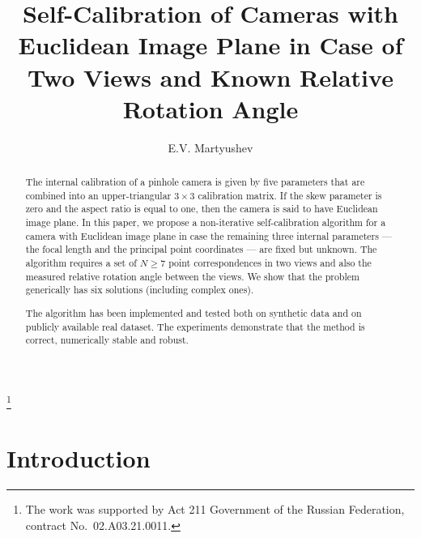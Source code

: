 \documentclass[reqno]{amsart}
\theoremstyle{plain}
\begin{document}
\title[Self-Calibration of Cameras with Euclidean Image Plane]{Self-Calibration of Cameras with Euclidean Image Plane in Case of Two Views and Known Relative Rotation Angle}

\author{E.V. Martyushev}

\thanks{The work was supported by Act 211 Government of the Russian Federation, contract No.~02.A03.21.0011.}


\address{South Ural State University, 76 Lenin avenue, 454080 Chelyabinsk, Russia}

\begin{abstract}
The internal calibration of a pinhole camera is given by five parameters that are combined into an upper-triangular $3\times 3$ calibration matrix. If the skew parameter is zero and the aspect ratio is equal to one, then the camera is said to have Euclidean image plane. In this paper, we propose a non-iterative self-calibration algorithm for a camera with Euclidean image plane in case the remaining three internal parameters --- the focal length and the principal point coordinates --- are fixed but unknown. The algorithm requires a set of $N \geq 7$ point correspondences in two views and also the measured relative rotation angle between the views. We show that the problem generically has six solutions (including complex ones).

The algorithm has been implemented and tested both on synthetic data and on publicly available real dataset. The experiments demonstrate that the method is correct, numerically stable and robust.

\end{abstract}

\maketitle


\section{Introduction}
\end{document}

